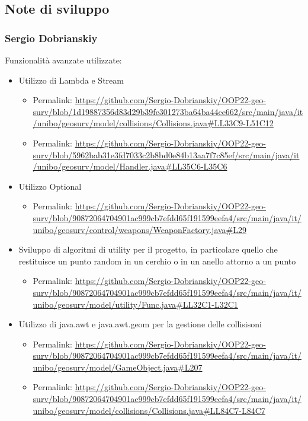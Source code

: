 \documentclass[a4paper,12pt]{report}
\begin{document}
\paragraph{}

\subsection{Note di sviluppo}

\subsubsection{Sergio Dobrianskiy}
Funzionalità avanzate utilizzate:
 \begin{itemize}
 	\item Utilizzo di Lambda e Stream
 	 \begin{itemize}
 	 	\item Permalink: \url{https://github.com/Sergio-Dobrianskiy/OOP22-geo-surv/blob/1d19887356d83d29b39fe301273ba64ba44ce662/src/main/java/it/unibo/geosurv/model/collisions/Collisions.java#LL33C9-L51C12}
 	 	\item Permalink: \url{https://github.com/Sergio-Dobrianskiy/OOP22-geo-surv/blob/5962bab31e3fd7033c2b8bd0e84b13aa7f7c85ef/src/main/java/it/unibo/geosurv/model/Handler.java#LL35C6-L35C6}
 	 \end{itemize}
 	 
 	 \item Utilizzo Optional
 	 \begin{itemize}
 	 	\item Permalink: \url{https://github.com/Sergio-Dobrianskiy/OOP22-geo-surv/blob/90872064704901ac999cb7efdd65f191599eefa4/src/main/java/it/unibo/geosurv/control/weapons/WeaponFactory.java#L29}
 	 \end{itemize}
 	 
 	 \item Sviluppo di algoritmi di utility per il progetto, in particolare quello che restituisce un punto random in un cerchio o in un anello attorno a un punto
 	 \begin{itemize}
 	 	\item Permalink: \url{https://github.com/Sergio-Dobrianskiy/OOP22-geo-surv/blob/90872064704901ac999cb7efdd65f191599eefa4/src/main/java/it/unibo/geosurv/model/utility/Func.java#LL32C1-L32C1}
 	 \end{itemize}
 	 
	\item Utilizzo di java.awt e java.awt.geom per la gestione delle collisisoni
 	 \begin{itemize}
 	 	\item Permalink: \url{https://github.com/Sergio-Dobrianskiy/OOP22-geo-surv/blob/90872064704901ac999cb7efdd65f191599eefa4/src/main/java/it/unibo/geosurv/model/GameObject.java#L207}
 	 	\item Permalink: \url{https://github.com/Sergio-Dobrianskiy/OOP22-geo-surv/blob/90872064704901ac999cb7efdd65f191599eefa4/src/main/java/it/unibo/geosurv/model/collisions/Collisions.java#LL84C7-L84C7}
 	 \end{itemize}
\end{itemize}
\end{document}
